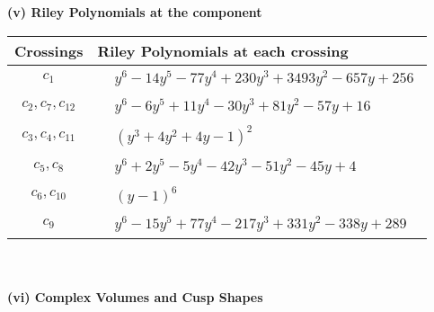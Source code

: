 \documentclass[1p]{elsarticle_modified}
\theoremstyle{definition}
\begin{document}
\newpage\renewcommand{\arraystretch}{1}
\flushleft \textbf{(v) Riley Polynomials at the component}\newline \\
\begin{tabular}{m{50pt}|m{274pt}}
Crossings & \hspace{64pt}Riley Polynomials at each crossing \\
\hline $$\begin{aligned}c_{1}\end{aligned}$$&$\begin{aligned}
&y^6-14 y^5-77 y^4+230 y^3+3493 y^2-657 y+256
\end{aligned}$\\
\hline $$\begin{aligned}c_{2},c_{7},c_{12}\end{aligned}$$&$\begin{aligned}
&y^6-6 y^5+11 y^4-30 y^3+81 y^2-57 y+16
\end{aligned}$\\
\hline $$\begin{aligned}c_{3},c_{4},c_{11}\end{aligned}$$&$\begin{aligned}
&(y^3+4 y^2+4 y-1)^2
\end{aligned}$\\
\hline $$\begin{aligned}c_{5},c_{8}\end{aligned}$$&$\begin{aligned}
&y^6+2 y^5-5 y^4-42 y^3-51 y^2-45 y+4
\end{aligned}$\\
\hline $$\begin{aligned}c_{6},c_{10}\end{aligned}$$&$\begin{aligned}
&(y-1)^6
\end{aligned}$\\
\hline $$\begin{aligned}c_{9}\end{aligned}$$&$\begin{aligned}
&y^6-15 y^5+77 y^4-217 y^3+331 y^2-338 y+289
\end{aligned}$\\
\hline
\end{tabular}\\~\\
\newpage\flushleft \textbf{(vi) Complex Volumes and Cusp Shapes}
\end{document}
